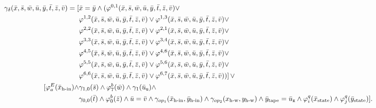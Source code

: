\begin{align*}
\gamma_{\delta}(\bar{x},\bar{s},\bar{w},\bar{u},\bar{y},\bar{t},\bar{z},\bar{v}) = 	[&\bar{x} = \bar{y} \wedge (\varphi^{0,1}(\bar{x},\bar{s},\bar{w},\bar{u},\bar{y},\bar{t},\bar{z},\bar{v}) \vee \\ &\varphi^{1,2}(\bar{x},\bar{s},\bar{w},\bar{u},\bar{y},\bar{t},\bar{z},\bar{v}) \vee \varphi^{1,3}(\bar{x},\bar{s},\bar{w},\bar{u},\bar{y},\bar{t},\bar{z},\bar{v}) \vee \\ &\varphi^{2,2}(\bar{x},\bar{s},\bar{w},\bar{u},\bar{y},\bar{t},\bar{z},\bar{v}) \vee \varphi^{2,1}(\bar{x},\bar{s},\bar{w},\bar{u},\bar{y},\bar{t},\bar{z},\bar{v}) \vee \\ &\varphi^{3,3}(\bar{x},\bar{s},\bar{w},\bar{u},\bar{y},\bar{t},\bar{z},\bar{v}) \vee \varphi^{3,4}(\bar{x},\bar{s},\bar{w},\bar{u},\bar{y},\bar{t},\bar{z},\bar{v}) \vee \\ &\varphi^{4,5}(\bar{x},\bar{s},\bar{w},\bar{u},\bar{y},\bar{t},\bar{z},\bar{v}) \vee \varphi^{4,6}(\bar{x},\bar{s},\bar{w},\bar{u},\bar{y},\bar{t},\bar{z},\bar{v}) \vee \\ &\varphi^{5,5}(\bar{x},\bar{s},\bar{w},\bar{u},\bar{y},\bar{t},\bar{z},\bar{v}) \vee  \varphi^{5,6}(\bar{x},\bar{s},\bar{w},\bar{u},\bar{y},\bar{t},\bar{z},\bar{v}) \vee \\ &\varphi^{6,6}(\bar{x},\bar{s},\bar{w},\bar{u},\bar{y},\bar{t},\bar{z},\bar{v}) \vee \varphi^{6,7}(\bar{x},\bar{s},\bar{w},\bar{u},\bar{y},\bar{t},\bar{z},\bar{v}))] \, \vee \\
[\varphi^E_a(\bar{x}_{\text{h-in}}) \wedge &\gamma_{1,0}(\bar{s}) \wedge \varphi^b_7(\bar{w}) \wedge \gamma_1(\bar{u}_{\algu}) \wedge \\ &\gamma_{0,0}(\bar{t}) \wedge \varphi^b_0(\bar{z}) \wedge \bar{u} = \bar{v} \wedge
\gamma_{op_1}(\bar{x}_{\text{h-in}},\bar{y}_{\text{h-in}}) \wedge \gamma_{op_2}(x_{\text{h-w}},y_{\text{h-w}}) \wedge \bar{y}_{\text{tape}} = \bar{u}_{\algx} \wedge \varphi^q_i(\bar{x}_{\text{state}}) \wedge \varphi^q_j(\bar{y}_{\text{state}})].
\end{align*}

